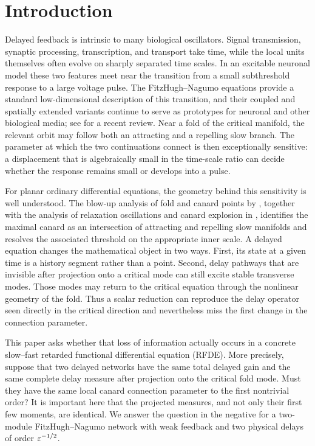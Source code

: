 \section{Introduction}
\label{sec:introduction}

Delayed feedback is intrinsic to many biological oscillators.  Signal
transmission, synaptic processing, transcription, and transport take time,
while the local units themselves often evolve on sharply separated time
scales.  In an excitable neuronal model these two features meet near the
transition from a small subthreshold response to a large voltage pulse.  The
FitzHugh--Nagumo equations provide a standard low-dimensional description of
this transition, and their coupled and spatially extended variants continue
to serve as prototypes for neuronal and other biological media; see
\citet{cebrianlacasa2024six} for a recent review.  Near a fold of the critical
manifold, the relevant orbit may follow both an attracting and a repelling
slow branch.  The parameter at which the two continuations connect is then
exceptionally sensitive: a displacement that is algebraically small in the
time-scale ratio can decide whether the response remains small or develops
into a pulse.

For planar ordinary differential equations, the geometry behind this
sensitivity is well understood.  The blow-up analysis of fold and canard
points by \citet{krupa2001extending}, together with the analysis of relaxation
oscillations and canard explosion in \citet{krupa2001relaxation}, identifies
the maximal canard as an intersection of attracting and repelling slow
manifolds and resolves the associated threshold on the appropriate inner
scale.  A delayed equation changes the mathematical object in two ways.
First, its state at a given time is a history segment rather than a point.
Second, delay pathways that are invisible after projection onto a critical
mode can still excite stable transverse modes.  Those modes may return to the
critical equation through the nonlinear geometry of the fold.  Thus a scalar
reduction can reproduce the delay operator seen directly in the critical
direction and nevertheless miss the first change in the connection
parameter.

This paper asks whether that loss of information actually occurs in a
concrete slow--fast retarded functional differential equation (RFDE).  More
precisely, suppose that two delayed networks have the same total delayed gain
and the same complete delay measure after projection onto the critical fold
mode.  Must they have the same local canard connection parameter to the first
nontrivial order?  It is important here that the projected measures, and not
only their first few moments, are identical.  We answer the question in the
negative for a two-module FitzHugh--Nagumo network with weak feedback and two
physical delays of order \(\varepsilon^{-1/2}\).

